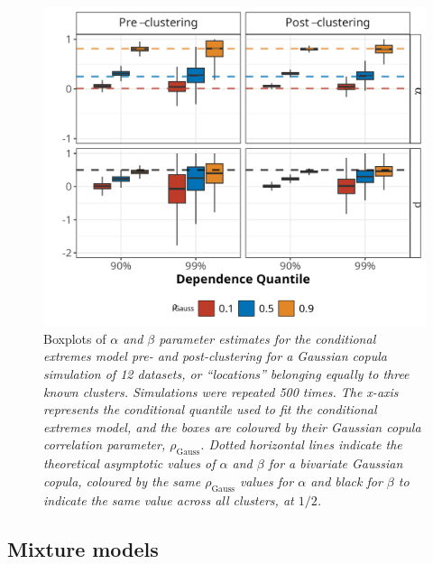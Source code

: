 \documentclass{article}
\numberwithin{equation}{section}
\begin{document}
\begin{figure}[H]
    \centering
    \includegraphics[width = 0.9\linewidth]{plots/sim_01_gauss_cop.png}
    \caption{Boxplots of \emph{$\alpha$ and $\beta$ parameter estimates for the conditional extremes model pre- and post-clustering for a Gaussian copula simulation of 12 datasets, or ``locations'' belonging equally to three known clusters. Simulations were repeated 500 times. The x-axis represents the conditional quantile used to fit the conditional extremes model, and the boxes are coloured by their Gaussian copula correlation parameter, $\rho_{\text{Gauss}}$. Dotted horizontal lines indicate the theoretical asymptotic values of $\alpha$ and $\beta$ for a bivariate Gaussian copula, coloured by the same $\rho_{\text{Gauss}}$ values for $\alpha$ and black for $\beta$ to indicate the same value across all clusters, at $1/2$.}}
    \label{fig:00_gauss_cop}
\end{figure}


\subsection{Mixture models} \label{subsec:sim_mixture}
\end{document}
